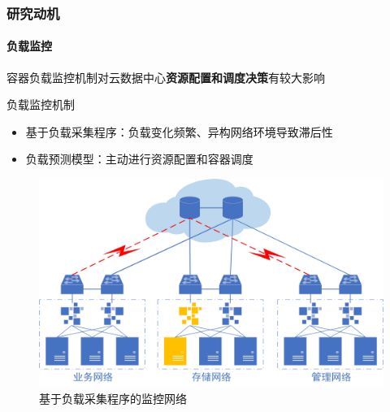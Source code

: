 \begin{frame}
\frametitle{研究动机}
\framesubtitle{负载监控}
容器负载监控机制对云数据中心\textbf{\alert{资源配置和调度决策}}有较大影响

\begin{block}{负载监控机制}
\begin{itemize}
    \item<1-> 基于负载采集程序：负载变化频繁、异构网络环境导致滞后性
    \item<2-> 负载预测模型：主动进行资源配置和容器调度
\end{itemize}
\end{block}
\begin{figure}[htb]
\centering
    \includegraphics[scale=0.41]{figures/fig3_mmn.jpg}
    \caption{基于负载采集程序的监控网络}
    \label{fig:fig3}
\end{figure}
\end{frame}

